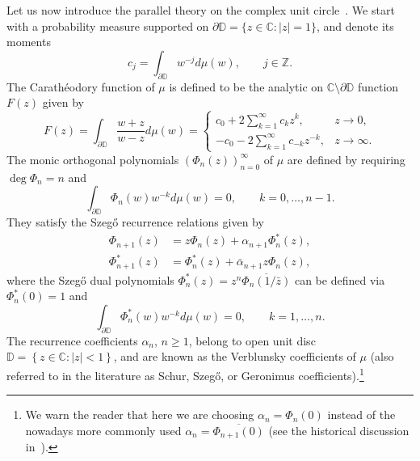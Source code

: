 \documentclass[reqno,centertags,11pt,draft]{amsart}
\newcommand{\C}{\mathbb C}
\newcommand{\Z}{\mathbb{Z}}
\newcommand{\T}{\mathbb{\partial\mathbb{D}}}
\newcommand{\D}{\mathbb{D}}
\newcommand{\abs}[1]{\left|#1\right|}
\newcommand{\set}[1]{\left\{#1\right\}}
\begin{document}

Let us now introduce the parallel theory on the complex unit circle~\cites{OPUC1,OPUC2,GeronimusBook,SzegoBook}. We start with  a probability measure supported on  $\T=\{z\in\C: |z|=1\}$, and denote its moments 
$$
c_j = \int_\T w^{-j} d\mu(w), \qquad j\in\Z.
$$
The Carath\'{e}odory function of $\mu$ is defined to be the analytic on $\C\setminus\T$ function $F(z)$ given by
\begin{equation}\label{eq:F}
    F(z) = \int_\T \frac{w+z}{w-z} d\mu(w)
    =
    \begin{cases}
         c_{0} + 2\sum_{k = 1}^{\infty}c_{k}z^k, & z\to0,
         \\
        -c_{0} - 2\sum_{k = 1}^{\infty}c_{-k}z^{-k}, & z\to\infty.
    \end{cases}
\end{equation}
The monic orthogonal polynomials $(\Phi_n(z))_{n = 0}^\infty$ of $\mu$ are defined by requiring $\deg{\Phi_n} = n$ and
\begin{equation}\label{eq:opuc1}
    \int_\T \Phi_n(w)w^{-k} d\mu(w) = 0, \qquad k = 0,\dots,n-1.
\end{equation}
They satisfy the Szeg\H{o} recurrence relations given by
\begin{align}
\label{eq:scalar szego 1}
\Phi_{n+1}(z) & = z\Phi_n(z) + {\alpha}_{n+1}\Phi^*_{n}(z),
\\
\label{eq:scalar szego 2}
\Phi^*_{n+1}(z) & =  \Phi^*_n(z) + \bar\alpha_{n+1}z\Phi_{n}(z),
\end{align}
where the Szeg\H{o} dual polynomials $\Phi_n^*(z) = z^n\overline{\Phi_n(1/\bar z)}$ can be defined via $\Phi_n^*(0)=1$ and
\begin{equation}\label{eq:Phi^*}
    \int_\T \Phi^*_n(w)w^{-k} d\mu(w) = 0, \qquad k = 1,\dots,n.
\end{equation}
The recurrence coefficients $\alpha_n$, $n\ge 1$, belong to open unit disc $\D = \set{z \in \C : \abs{z} < 1}$, and are known as the Verblunsky coefficients of $\mu$ (also referred to in the literature as Schur, Szeg\H{o}, or Geronimus coefficients).\footnote{We warn the reader that here we are choosing $\alpha_n = \Phi_n(0)$ instead of the nowadays more commonly used $\alpha_n = \overline{\Phi_{n+1}(0)}$ %
(see the historical discussion in~\cite[p.10]{OPUC1}).}
\end{document}
